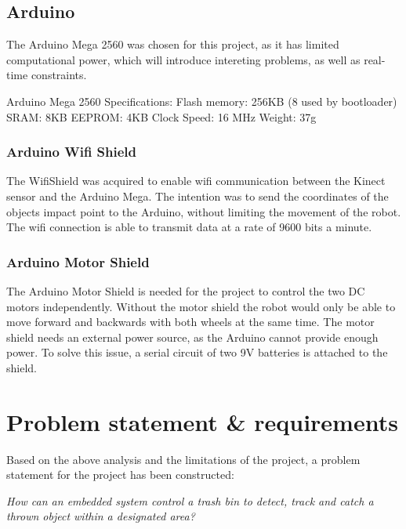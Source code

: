 \subsection{Arduino}
\label{sec:Arduino}
The Arduino Mega 2560 was chosen for this project, as it has limited computational power, which will introduce intereting problems, as well as real-time constraints. \citep{a}

Arduino Mega 2560 Specifications:\newline
Flash memory: 256KB (8 used by bootloader)\newline
SRAM: 8KB\newline
EEPROM: 4KB\newline
Clock Speed: 16 MHz\newline
Weight: 37g

\subsubsection{Arduino Wifi Shield}
\label{sec: Arduino Wifi Shield}
The WifiShield was acquired to enable wifi communication between the Kinect sensor and the Arduino Mega. The intention was to send the coordinates of the objects impact point to the Arduino, without limiting the movement of the robot. The wifi connection is able to transmit data at a rate of 9600 bits a minute. 
\citep{aws}

\subsubsection{Arduino Motor Shield}
\label{sec:Arduino Motor Shield}
The Arduino Motor Shield is needed for the project to control the two DC motors independently. Without the motor shield the robot would only be able to move forward and backwards with both wheels at the same time. 
The motor shield needs an external power source, as the Arduino cannot provide enough power. To solve this issue, a serial circuit of two 9V batteries is attached to the shield. \citep{ams}

\section{Problem statement \& requirements}
\label{sec:Problem statement}
Based on the above analysis and the limitations of the project, a problem statement for the project has been constructed:

\textit{How can an embedded system control a trash bin to detect, track and catch a thrown object within a designated area?}

